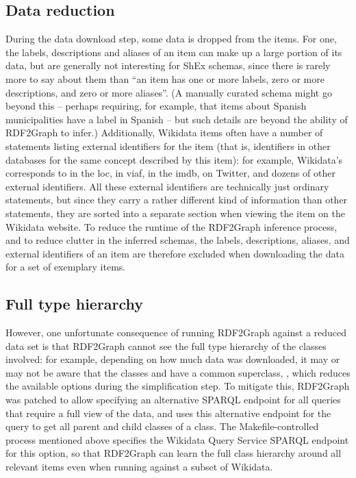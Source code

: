 \subsection{Data reduction}
\label{subsec:RDF2Graph+Wikidata:Wikidata:reduction}

During the data download step, some data is dropped from the items.
For one, the labels, descriptions and aliases of an item can make up a large portion of its data,
but are generally not interesting for ShEx schemas,
since there is rarely more to say about them than
“an item has one or more labels, zero or more descriptions, and zero or more aliases”. %
(A manually curated schema might go beyond this –
perhaps requiring, for example, that items about Spanish municipalities have a label in Spanish –
but such details are beyond the ability of RDF2Graph to infer.)
Additionally, Wikidata items often have a number of statements listing external identifiers for the item
(that is, identifiers in other databases for the same concept described by this item):
for example, Wikidata’s  corresponds to  in the \gls{loc},
 in \gls{viaf},
 in the \gls{imdb},
 on Twitter,
and dozens of other external identifiers. %
All these external identifiers are technically just ordinary statements,
but since they carry a rather different kind of information than other statements,
they are sorted into a separate section when viewing the item on the Wikidata website.
To reduce the runtime of the RDF2Graph inference process,
and to reduce clutter in the inferred schemas,
the labels, descriptions, aliases, and external identifiers of an item
are therefore excluded when downloading the data for a set of exemplary items.

\subsection{Full type hierarchy}
\label{subsec:RDF2Graph+Wikidata:Wikidata:hierarchy}

However, one unfortunate consequence of running RDF2Graph against a reduced data set
is that RDF2Graph cannot see the full type hierarchy of the classes involved:
for example, depending on how much data was downloaded,
it may or may not be aware that the classes  and 
have a common superclass, ,
which reduces the available options during the simplification step. %
To mitigate this, RDF2Graph was patched %
to allow specifying an alternative SPARQL endpoint for all queries that require a full view of the data,
and uses this alternative endpoint for the query to get all parent and child classes of a class.
The Makefile-controlled process mentioned above %
specifies the Wikidata Query Service SPARQL endpoint for this option,
so that RDF2Graph can learn the full class hierarchy around all relevant items %
even when running against a subset of Wikidata. %

